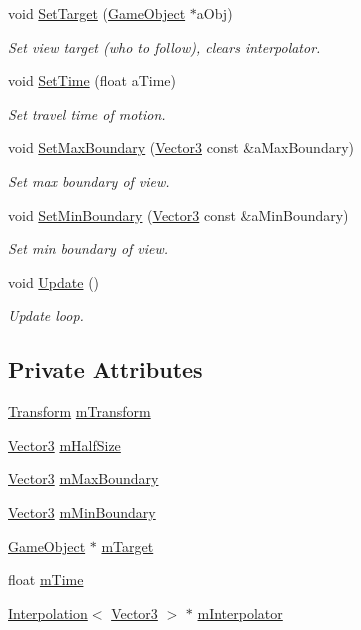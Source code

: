 \begin{DoxyCompactItemize}
void \hyperlink{classView_a7dd425ca7734d703adeb2d70f15358be}{Set\+Target} (\hyperlink{classGameObject}{Game\+Object} $\ast$a\+Obj)
\begin{DoxyCompactList}\small\item\em Set view target (who to follow), clears interpolator. \end{DoxyCompactList}\item 
void \hyperlink{classView_a7658c93b38082640acb8cab5910963fd}{Set\+Time} (float a\+Time)
\begin{DoxyCompactList}\small\item\em Set travel time of motion. \end{DoxyCompactList}\item 
void \hyperlink{classView_a8df97a7b467a3bb0256e31428d04dafd}{Set\+Max\+Boundary} (\hyperlink{structVector3}{Vector3} const \&a\+Max\+Boundary)
\begin{DoxyCompactList}\small\item\em Set max boundary of view. \end{DoxyCompactList}\item 
void \hyperlink{classView_a68644e92d6752ab8119e5ec8277853be}{Set\+Min\+Boundary} (\hyperlink{structVector3}{Vector3} const \&a\+Min\+Boundary)
\begin{DoxyCompactList}\small\item\em Set min boundary of view. \end{DoxyCompactList}\item 
void \hyperlink{classView_a04753454b8a9c533469a24d7c202b994}{Update} ()
\begin{DoxyCompactList}\small\item\em Update loop. \end{DoxyCompactList}\end{DoxyCompactItemize}
\subsection*{Private Attributes}
\begin{DoxyCompactItemize}
\item 
\hyperlink{classTransform}{Transform} \hyperlink{classView_a0d6ae028e18a181c998c8f04be9b8b4f}{m\+Transform}
\item 
\hyperlink{structVector3}{Vector3} \hyperlink{classView_aa2b272158437993a873cf93d934f3d4c}{m\+Half\+Size}
\item 
\hyperlink{structVector3}{Vector3} \hyperlink{classView_afe0ac455a31422c43d5fa3dcd2e51fc4}{m\+Max\+Boundary}
\item 
\hyperlink{structVector3}{Vector3} \hyperlink{classView_a3581943c539feca7e21be9990cbe9de0}{m\+Min\+Boundary}
\item 
\hyperlink{classGameObject}{Game\+Object} $\ast$ \hyperlink{classView_a7c296061a47055cda78fcf06550d71ce}{m\+Target}
\item 
float \hyperlink{classView_ac9f619992f8bbfcc829ec316bde2ca8f}{m\+Time}
\item 
\hyperlink{classInterpolation}{Interpolation}$<$ \hyperlink{structVector3}{Vector3} $>$ $\ast$ \hyperlink{classView_a673bc4569d721610d26180bbc14813dc}{m\+Interpolator}
\end{DoxyCompactItemize}


